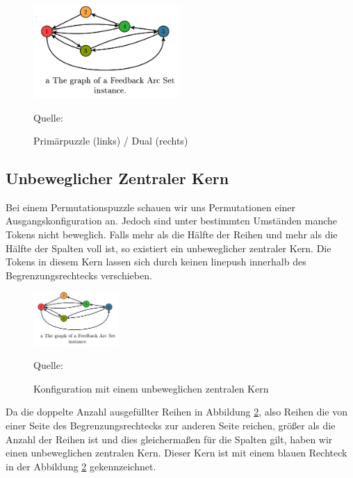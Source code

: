 \documentclass[seminar,german]{algothesis}
\newcommand*{\quelle}{%
  \footnotesize Quelle:
}
\begin{document}
\begin{figure}[ht]
	\centering
	\includegraphics[width=0.5\textwidth]{graph}
	\caption{Primärpuzzle (links) / Dual (rechts)}
	\quelle \cite{akitaya2022pushing}
	\label{fig:11}
\end{figure}

\newpage
\subsection{Unbeweglicher Zentraler Kern}
Bei einem Permutationspuzzle schauen wir uns Permutationen einer Ausgangskonfiguration an. Jedoch sind unter bestimmten Umständen manche Tokens nicht beweglich. Falls mehr als die Hälfte der Reihen und mehr als die Hälfte der Spalten voll ist, so existiert ein unbeweglicher zentraler Kern. Die Tokens in diesem Kern lassen sich durch keinen linepush innerhalb des Begrenzungsrechtecks verschieben.

\begin{figure}[ht]
	\centering
	\includegraphics[width=0.29\textwidth]{graph}
	\caption{Konfiguration mit einem unbeweglichen zentralen Kern}
	\quelle \cite{akitaya2022pushing}
	\label{fig:12}
\end{figure}

\noindent Da die doppelte Anzahl ausgefüllter Reihen in Abbildung \ref{fig:12}, also Reihen die von einer Seite des Begrenzungsrechtecks zur anderen Seite reichen, größer als die Anzahl der Reihen ist und dies gleichermaßen für die Spalten gilt, haben wir einen unbeweglichen zentralen Kern. Dieser Kern ist mit einem blauen Rechteck in der Abbildung \ref{fig:12} gekennzeichnet.
\end{document}
